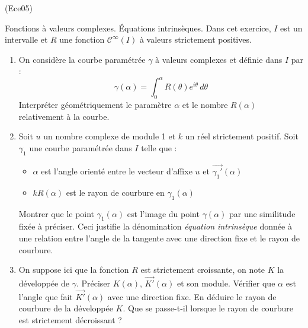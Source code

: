 \begin{tiny}(Ece05)\end{tiny}
Fonctions à valeurs complexes. {\'E}quations intrinsèques. Dans cet exercice, $I$ est un intervalle et $R$ une fonction $\mathcal{C}^\infty(I)$ à valeurs strictement positives.
\begin{enumerate}
\item On considère la courbe paramétrée $\gamma$ à valeurs complexes et définie dans $I$ par :
\[\gamma(\alpha)=\int _{0}^{\alpha}R(\theta)e^{i\theta}\,d\theta\]
Interpréter géométriquement le paramètre $\alpha$ et le nombre $R(\alpha)$ relativement à la courbe.
\item Soit $u$ un nombre complexe de module 1 et $k$ un réel strictement positif. Soit $\gamma_1$ une courbe paramétrée dans $I$ telle que :
\begin{itemize}
\item $\alpha$ est l'angle orienté entre le vecteur d'affixe $u$ et $\overrightarrow{\gamma_1'}(\alpha)$
\item $kR(\alpha)$ est le rayon de courbure en $\gamma_1(\alpha)$
\end{itemize}
Montrer que le point $\gamma_1(\alpha)$ est l'image du point $\gamma(\alpha)$ par une similitude fixée à préciser.\newline
Ceci justifie la dénomination \emph{équation intrinsèque} donnée à une relation entre l'angle de la tangente avec une direction fixe et le rayon de courbure.
\item On suppose ici que la fonction $R$ est strictement croissante, on note $K$ la développée de $\gamma$. Préciser $K(\alpha)$, $\overrightarrow{K'}(\alpha)$ et son module. Vérifier que $\alpha$ est l'angle que fait $\overrightarrow{K'}(\alpha)$ avec une direction fixe. En déduire le rayon de courbure de la développée $K$. Que se passe-t-il lorsque le rayon de courbure est strictement décroissant ?
\end{enumerate}